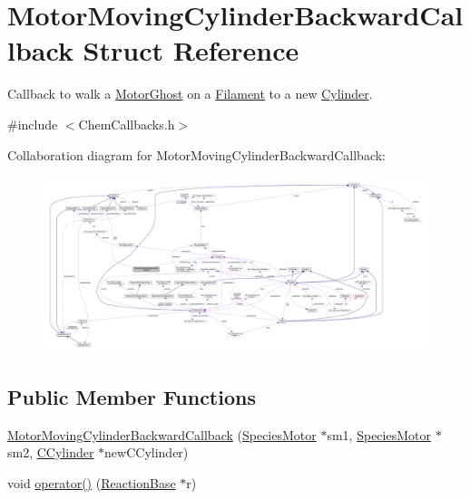\hypertarget{structMotorMovingCylinderBackwardCallback}{\section{Motor\+Moving\+Cylinder\+Backward\+Callback Struct Reference}
\label{structMotorMovingCylinderBackwardCallback}
}


Callback to walk a \hyperlink{classMotorGhost}{Motor\+Ghost} on a \hyperlink{classFilament}{Filament} to a new \hyperlink{classCylinder}{Cylinder}.  




{\ttfamily \#include $<$Chem\+Callbacks.\+h$>$}



Collaboration diagram for Motor\+Moving\+Cylinder\+Backward\+Callback\+:
\nopagebreak
\begin{figure}[H]
\begin{center}
\leavevmode
\includegraphics[width=350pt]{structMotorMovingCylinderBackwardCallback__coll__graph}
\end{center}
\end{figure}
\subsection*{Public Member Functions}
\begin{DoxyCompactItemize}
\item 
\hyperlink{structMotorMovingCylinderBackwardCallback_affc37b3fcfb9c4274784e42d6d74b31a}{Motor\+Moving\+Cylinder\+Backward\+Callback} (\hyperlink{classSpeciesMotor}{Species\+Motor} $\ast$sm1, \hyperlink{classSpeciesMotor}{Species\+Motor} $\ast$sm2, \hyperlink{classCCylinder}{C\+Cylinder} $\ast$new\+C\+Cylinder)
\item 
void \hyperlink{structMotorMovingCylinderBackwardCallback_ab157006ae9fc4b8ccf4a30ddbf042f6e}{operator()} (\hyperlink{classReactionBase}{Reaction\+Base} $\ast$r)
\end{DoxyCompactItemize}
